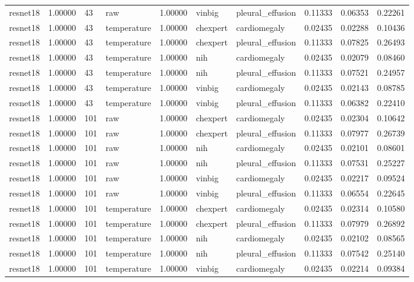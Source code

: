 \begin{tabular}{lrllrllrrr}
resnet18 & 1.00000 & 43 & raw & 1.00000 & vinbig & pleural\_effusion & 0.11333 & 0.06353 & 0.22261 \\
resnet18 & 1.00000 & 43 & temperature & 1.00000 & chexpert & cardiomegaly & 0.02435 & 0.02288 & 0.10436 \\
resnet18 & 1.00000 & 43 & temperature & 1.00000 & chexpert & pleural\_effusion & 0.11333 & 0.07825 & 0.26493 \\
resnet18 & 1.00000 & 43 & temperature & 1.00000 & nih & cardiomegaly & 0.02435 & 0.02079 & 0.08460 \\
resnet18 & 1.00000 & 43 & temperature & 1.00000 & nih & pleural\_effusion & 0.11333 & 0.07521 & 0.24957 \\
resnet18 & 1.00000 & 43 & temperature & 1.00000 & vinbig & cardiomegaly & 0.02435 & 0.02143 & 0.08785 \\
resnet18 & 1.00000 & 43 & temperature & 1.00000 & vinbig & pleural\_effusion & 0.11333 & 0.06382 & 0.22410 \\
resnet18 & 1.00000 & 101 & raw & 1.00000 & chexpert & cardiomegaly & 0.02435 & 0.02304 & 0.10642 \\
resnet18 & 1.00000 & 101 & raw & 1.00000 & chexpert & pleural\_effusion & 0.11333 & 0.07977 & 0.26739 \\
resnet18 & 1.00000 & 101 & raw & 1.00000 & nih & cardiomegaly & 0.02435 & 0.02101 & 0.08601 \\
resnet18 & 1.00000 & 101 & raw & 1.00000 & nih & pleural\_effusion & 0.11333 & 0.07531 & 0.25227 \\
resnet18 & 1.00000 & 101 & raw & 1.00000 & vinbig & cardiomegaly & 0.02435 & 0.02217 & 0.09524 \\
resnet18 & 1.00000 & 101 & raw & 1.00000 & vinbig & pleural\_effusion & 0.11333 & 0.06554 & 0.22645 \\
resnet18 & 1.00000 & 101 & temperature & 1.00000 & chexpert & cardiomegaly & 0.02435 & 0.02314 & 0.10580 \\
resnet18 & 1.00000 & 101 & temperature & 1.00000 & chexpert & pleural\_effusion & 0.11333 & 0.07979 & 0.26892 \\
resnet18 & 1.00000 & 101 & temperature & 1.00000 & nih & cardiomegaly & 0.02435 & 0.02102 & 0.08565 \\
resnet18 & 1.00000 & 101 & temperature & 1.00000 & nih & pleural\_effusion & 0.11333 & 0.07542 & 0.25140 \\
resnet18 & 1.00000 & 101 & temperature & 1.00000 & vinbig & cardiomegaly & 0.02435 & 0.02214 & 0.09384 \\

\end{tabular}

